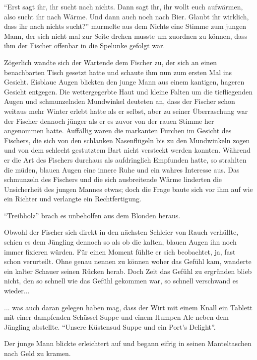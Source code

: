 ``Erst sagt ihr, ihr sucht nach nichts. Dann sagt ihr, ihr wollt euch aufwärmen, also sucht ihr nach Wärme. Und dann auch noch nach Bier. Glaubt ihr wirklich, dass ihr nach nichts sucht?'' murmelte aus dem Nichts eine Stimme zum jungen Mann, der sich nicht mal zur Seite drehen musste um zuordnen zu können, dass ihm der Fischer offenbar in die Spelunke gefolgt war.

Zögerlich wandte sich der Wartende dem Fischer zu, der sich an einen benachbarten Tisch gesetzt hatte und schaute ihm nun zum ersten Mal ins Gesicht. Eisblaue Augen blickten den junge Mann aus einem kantigen, hageren Gesicht entgegen. Die wettergegerbte Haut und kleine Falten um die tiefliegenden Augen und schmunzelnden Mundwinkel deuteten an, dass der Fischer schon weitaus mehr Winter erlebt hatte als er selbst, aber zu seiner Überraschung war der Fischer dennoch jünger als er es zuvor von der rauen Stimme her angenommen hatte. Auffällig waren die markanten Furchen im Gesicht des Fischers, die sich von den schlanken Nasenflügeln bis zu den Mundwinkeln zogen und von dem schlecht gestutztem Bart nicht versteckt werden konnten. Während er die Art des Fischers durchaus als aufdringlich Empfunden hatte, so strahlten die müden, blauen Augen eine innere Ruhe und ein wahres Interesse aus. Das schmunzeln des Fischers und die sich ausbreitende Wärme linderten die Unsicherheit des jungen Mannes etwas; doch die Frage baute sich vor ihm auf wie ein Richter und verlangte ein Rechtfertigung.

``Treibholz'' brach es unbeholfen aus dem Blonden heraus.

Obwohl der Fischer sich direkt in den nächsten Schleier von Rauch verhüllte, schien es dem Jüngling dennoch so als ob die kalten, blauen Augen ihn noch immer fixieren würden. Für einen Moment fühlte er sich beobachtet, ja, fast schon verurteilt. Ohne genau nennen zu können woher das Gefühl kam, wanderte ein kalter Schauer seinen Rücken herab. Doch Zeit das Gefühl zu ergründen blieb nicht, den so schnell wie das Gefühl gekommen war, so schnell verschwand es wieder...

... was auch daran gelegen haben mag, dass der Wirt mit einem Knall ein Tablett mit einer dampfenden Schüssel Suppe und einem Humpen Ale neben dem Jüngling abstellte. ``Unsere Küstensud Suppe und ein Port's Delight''.

Der junge Mann blickte erleichtert auf und begann eifrig in seinen Manteltaschen nach Geld zu kramen.

